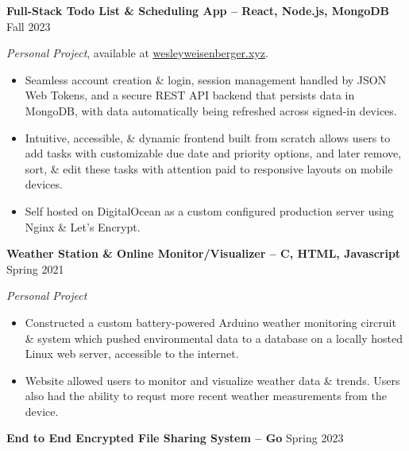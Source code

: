 \documentclass{article}
\begin{document}

\begin{adjustwidth}{1em}{1em}



    \textbf{Full-Stack Todo List \& Scheduling App -- React, Node.js, MongoDB} \hfill Fall 2023

    \textit{Personal Project}, available at \href{https://wesleyweisenberger.xyz}{wesleyweisenberger.xyz}.
    \begin{itemize}
        \item Seamless account creation \& login, session management handled by JSON Web Tokens, and a secure REST API backend that persists data in MongoDB, with data automatically being refreshed across signed-in devices.
        \item Intuitive, accessible, \& dynamic frontend built from scratch allows users to add tasks with customizable due date and priority options, and later remove, sort, \& edit these tasks with attention paid to responsive layouts on mobile devices.
        \item Self hosted on DigitalOcean as a custom configured production server using Nginx \& Let's Encrypt.
    \end{itemize}



    \vspace{1mm}



    \noindent \textbf{Weather Station \& Online Monitor/Visualizer -- C, HTML, Javascript} \hfill Spring 2021

    \textit{Personal Project}

    \begin{itemize}
        \item Constructed a custom battery-powered Arduino weather monitoring circruit \& system which pushed environmental data to a database on a locally hosted Linux web server, accessible to the internet.
        \item Website allowed users to monitor and visualize weather data \& trends. Users also had the ability to requst more recent weather measurements from the device.
    \end{itemize}



    \vspace{1mm}



    \textbf{End to End Encrypted File Sharing System -- Go} \hfill Spring 2023


\end{adjustwidth}
\end{document}
